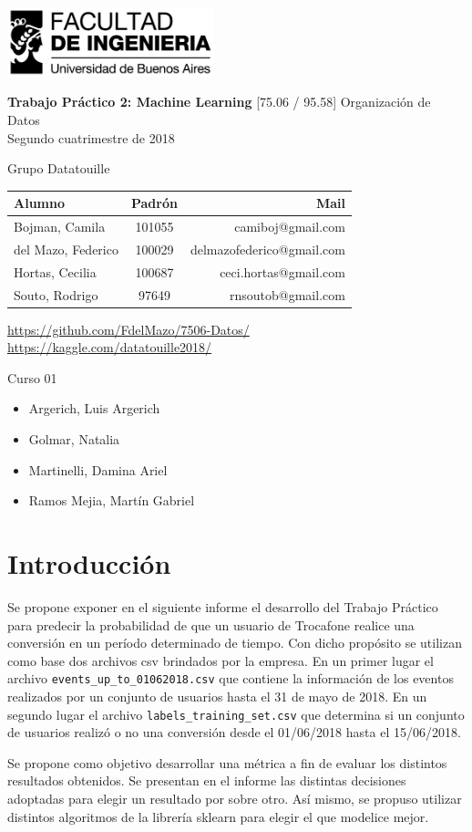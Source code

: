 \documentclass[a4paper]{article}
\makeatletter
\newcommand{\materia}{[75.06 / 95.58] Organización de Datos}
\newcommand{\trabajo}{Trabajo Práctico 2: Machine Learning}
\newcommand{\cuatrimestre}{Segundo cuatrimestre de 2018}
\newcommand{\grupo}{Grupo Datatouille}
\newcommand{\repo}{https://github.com/FdelMazo/7506-Datos/}
\newcommand{\kernel}{https://kaggle.com/datatouille2018/}
\newcommand{\alumnos}{
    Bojman, Camila & 101055 &  camiboj@gmail.com\\
    del Mazo, Federico & 100029 & delmazofederico@gmail.com\\
    Hortas, Cecilia & 100687 & ceci.hortas@gmail.com\\
    Souto, Rodrigo & 97649 & rnsoutob@gmail.com\\
}
\newcommand{\curso}{Curso 01}
\newcommand{\docentes}{
    \item Argerich, Luis Argerich
    \item Golmar, Natalia
    \item Martinelli, Damina Ariel
    \item Ramos Mejia, Martín Gabriel
}
\makeatother
\begin{document}

\begin{titlepage}
	\hfill\includegraphics[width=6cm]{fiuba.jpg}
    \begin{center}
    \vfill
    \Huge \textbf{\trabajo}
    \vskip2cm
    \Large \materia\\
    \cuatrimestre
    \vfill
    \begin{flushleft} 
    \grupo
    \end{flushleft}
    \begin{tabular}{|l|c|r|}
	\hline
	Alumno & Padrón & Mail\\
	\hline \hline
    \alumnos
	\hline
	\end{tabular}
    \begin{flushleft} 
    \large{\url{\repo}} \\
    \large{\url{\kernel}} \\
    \end{flushleft}
    \vskip1cm
    \end{center}
    \curso
    \begin{itemize}
        \docentes
    \end{itemize}
\end{titlepage}
\tableofcontents
\newpage
{}
\setcounter{page}{1}

\section{Introducción}

Se propone exponer en el siguiente informe el desarrollo del Trabajo Práctico para predecir la probabilidad de que un usuario de Trocafone realice una conversión en un período determinado de tiempo. Con dicho propósito se utilizan como base dos archivos csv brindados por la empresa. En un primer lugar el archivo \texttt{events\_up\_to\_01062018.csv} que contiene la información de los eventos realizados por un conjunto de usuarios hasta el 31 de mayo de 2018. En un segundo lugar el archivo \texttt{labels\_training\_set.csv} que determina si un conjunto de usuarios realizó o no una conversión desde el 01/06/2018 hasta el 15/06/2018. 

Se propone como objetivo desarrollar una métrica a fin de evaluar los distintos resultados obtenidos. Se presentan en el informe las distintas decisiones adoptadas para elegir un resultado por sobre otro. Así mismo, se propuso utilizar distintos algoritmos de la librería sklearn para elegir el que modelice mejor. 
\end{document}
